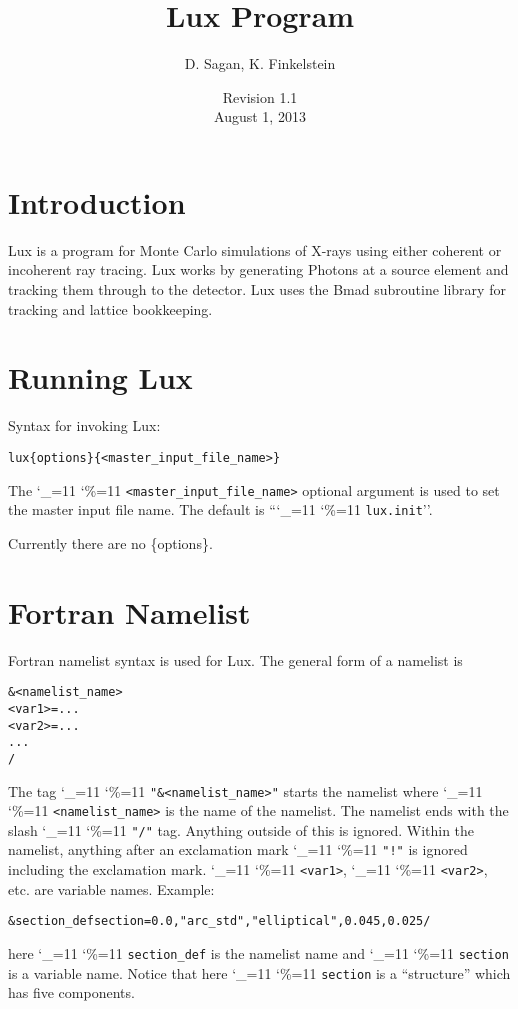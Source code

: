 \documentclass[11pt]{article}
\title{Lux Program}
\author{D. Sagan, K. Finkelstein}
\date{Revision 1.1 \\ August 1, 2013}
\newcommand{\lux}{Lux\xspace}
\newcommand\ttcmd{\begingroup\catcode`\_=11 \catcode`\%=11 \dottcmd}
\newcommand\dottcmd[1]{\texttt{#1}\endgroup}
\newcommand{\vn}{\ttcmd}
\newenvironment{example}
  {\vspace{\ExBeg} \begin{alltt}}
  {\end{alltt} \vspace{\ExEnd}}
\newlength{\ExBeg}
\newlength{\ExEnd}
\begin{document}
\maketitle

\tableofcontents

\section{Introduction} 
\label{s:intro}

\lux is a program for Monte Carlo simulations of X-rays using either
coherent or incoherent ray tracing. \lux works by generating
Photons at a source element and tracking them through to the
detector. \lux uses the Bmad subroutine library\cite{b:bmad} for
tracking and lattice bookkeeping.

\section{Running \lux} 
\label{s:run}

Syntax for invoking \lux:
\begin{example}
  lux \{options\} \{<master_input_file_name>\}
\end{example}
The \vn{<master_input_file_name>} optional argument is used to set the
master input file name. The default is ``\vn{lux.init}''. 

Currently there are no \{options\}.

\section{Fortran Namelist}
\label{s:namelist}

Fortran namelist syntax is used for \lux. The general form
of a namelist is
\begin{example}
  &<namelist_name>
    <var1> = ...
    <var2> = ...
    ...
  /
\end{example}
The tag \vn{"\&<namelist_name>"} starts the namelist where
\vn{<namelist_name>} is the name of the namelist. The namelist ends
with the slash \vn{"/"} tag. Anything outside of this is
ignored. Within the namelist, anything after an exclamation mark
\vn{"!"} is ignored including the exclamation mark. \vn{<var1>},
\vn{<var2>}, etc. are variable names. Example:
\begin{example}
  &section_def section =   0.0, "arc_std", "elliptical", 0.045, 0.025 /
\end{example}
here \vn{section_def} is the namelist name and \vn{section} is a variable
name.  Notice that here \vn{section} is a ``structure'' which has five
components.
\end{document}

